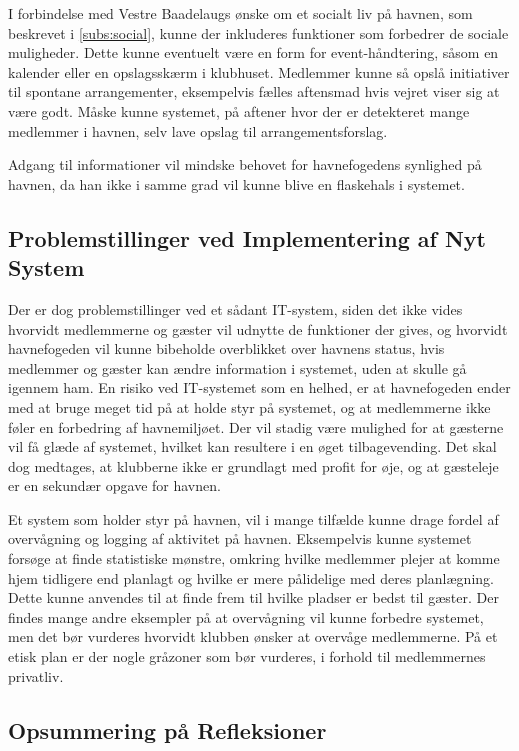 I forbindelse med Vestre Baadelaugs ønske om et socialt liv på havnen, som beskrevet i \cref{subs:social}, kunne der inkluderes funktioner som forbedrer de sociale muligheder. Dette kunne eventuelt være en form for event-håndtering, såsom en kalender eller en opslagsskærm i klubhuset. Medlemmer kunne så opslå initiativer til spontane arrangementer, eksempelvis fælles aftensmad hvis vejret viser sig at være godt. Måske kunne systemet, på aftener hvor der er detekteret mange medlemmer i havnen, selv lave opslag til arrangementsforslag.

Adgang til informationer vil mindske behovet for havnefogedens synlighed på havnen, da han ikke i samme grad vil kunne blive en flaskehals i systemet.

\subsection{Problemstillinger ved Implementering af Nyt System}

Der er dog problemstillinger ved et sådant IT-system, siden det ikke vides hvorvidt medlemmerne og gæster vil udnytte de funktioner der gives, og hvorvidt havnefogeden vil kunne bibeholde overblikket over havnens status, hvis medlemmer og gæster kan ændre information i systemet, uden at skulle gå igennem ham. En risiko ved IT-systemet som en helhed, er at havnefogeden ender med at bruge meget tid på at holde styr på systemet, og at medlemmerne ikke føler en forbedring af havnemiljøet. Der vil stadig være mulighed for at gæsterne vil få glæde af systemet, hvilket kan resultere i en øget tilbagevending. Det skal dog medtages, at klubberne ikke er grundlagt med profit for øje, og at gæsteleje er en sekundær opgave for havnen.

Et system som holder styr på havnen, vil i mange tilfælde kunne drage fordel af overvågning og logging af aktivitet på havnen. Eksempelvis kunne systemet forsøge at finde statistiske mønstre, omkring hvilke medlemmer plejer at komme hjem tidligere end planlagt og hvilke er mere pålidelige med deres planlægning. Dette kunne anvendes til at finde frem til hvilke pladser er bedst til gæster. Der findes mange andre eksempler på at overvågning vil kunne forbedre systemet, men det bør vurderes hvorvidt klubben ønsker at overvåge medlemmerne. På et etisk plan er der nogle gråzoner som bør vurderes, i forhold til medlemmernes privatliv.

\subsection{Opsummering på Refleksioner}

